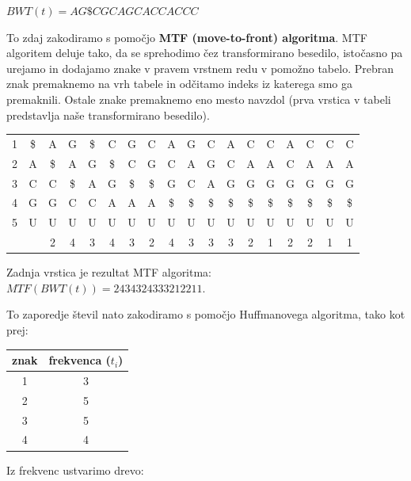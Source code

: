 \documentclass{article}
\begin{document}
\begin{enumerate}
\begin{enumerate}
			\begin{center}
				$BWT(t)=AG\$CGCAGCACCACCC$
			\end{center}

			To zdaj zakodiramo s pomočjo \textbf{MTF (move-to-front) algoritma}. MTF algoritem deluje tako, da
			se sprehodimo čez transformirano besedilo, istočasno pa urejamo in dodajamo znake v pravem vrstnem
			redu v pomožno tabelo. Prebran znak premaknemo na vrh tabele in odčitamo indeks iz katerega smo 
			ga premaknili. Ostale znake premaknemo eno mesto navzdol (prva vrstica v tabeli predstavlja naše 
			transformirano besedilo).

			\begin{center}
				\begin{tabular}{c c||cccccccccccccccc}
					1 & \$ & A & G & \$ & C & G & C & A & G & C & A & C & C & A & C & C & C \\
					2 & A & \$ & A & G & \$ & C & G & C & A & G & C & A & A & C & A & A & A \\
					3 & C & C & \$ & A & G & \$ & \$ & G & C & A & G & G & G & G & G & G & G \\
					4 & G & G & C & C & A & A & A & \$ & \$ & \$ & \$ & \$ & \$ & \$ & \$ & \$ & \$ \\
					5 & U & U & U & U & U & U & U & U & U & U & U & U & U & U & U & U & U \\
					\hline
					  &   & 2 & 4 & 3 & 4 & 3 & 2 & 4 & 3 & 3 & 3 & 2 & 1 & 2 & 2 & 1 & 1 \\
				\end{tabular}
			\end{center}
			
			Zadnja vrstica je rezultat MTF algoritma: $MTF(BWT(t))=2434324333212211$.

			To zaporedje števil nato zakodiramo s pomočjo Huffmanovega algoritma, tako kot prej:

			\begin{center}
				\begin{tabular}{c|c}
					znak & frekvenca ($t_i$) \\
					\hline
					1 & 3 \\
					2 & 5 \\
					3 & 5 \\
					4 & 4 \\
				\end{tabular}
			\end{center}

			Iz frekvenc ustvarimo drevo:


\end{enumerate}
\end{enumerate}
\end{document}
